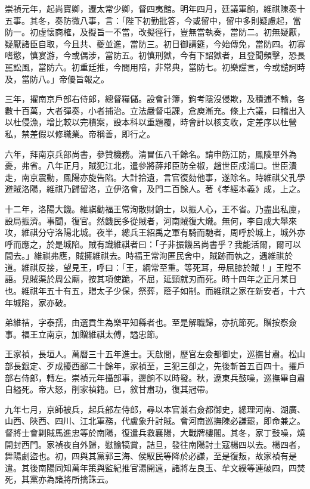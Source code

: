 \begin{pinyinscope}
崇禎元年，起尚寶卿，遷太常少卿，督四夷館。明年四月，廷議軍餉，維祺陳奏十五事。其冬，奏防微八事，言：「陛下初勤批答，今或留中，留中多則疑慮起，當防一。初虛懷商榷，及擬旨一不當，改擬徑行，豈無當執奏，當防二。初無疑厭，疑厭諸臣自取，今且共、夔並進，當防三。初日御講筵，今始傳免，當防四。初寡嗜慾，慎宴游，今或偶涉，當防五。初慎刑獄，今有下詔獄者，且登聞頻擊，恐長嚚訟風，當防六。初重廷推，今間用陪，非常典，當防七。初樂讜言，今或譴訶時及，當防八。」帝優旨報之。

三年，擢南京戶部右侍郎，總督糧儲。設會計簿，鉤考隱沒侵欺，及積逋不輸，各數十百萬，大者彈奏，小者捕治。立法嚴督屯課，倉庾漸充。條上六議，曰稽出入以杜侵漁，增比較以完積案，設本科以重題覆，時會計以核支收，定差序以杜營私，禁差假以修職業。帝稱善，即行之。

六年，拜南京兵部尚書，參贊機務。清冒伍八千餘名。請申飭江防，鳳陵單外為憂，弗省。八年正月，賊犯江北，遣參將薛邦臣防全椒，趙世臣戍浦口。世臣潰走，南京震動，鳳陽亦旋告陷。大計拾遺，言官復劾他事，遂除名。時維祺父孔學避賊洛陽，維祺乃歸留洛，立伊洛會，及門二百餘人。著《孝經本義》成，上之。

十二年，洛陽大饑。維祺勸福王常洵散財餉士，以振人心，王不省。乃盡出私廩，設局振濟。事聞，復官。然饑民多從賊者，河南賊復大熾。無何，李自成大舉來攻，維祺分守洛陽北城。夜半，總兵王紹禹之軍有騎而馳者，周呼於城上，城外亦呼而應之，於是城陷。賊有識維祺者曰：「子非振饑呂尚書乎？我能活爾，爾可以間去。」維祺弗應，賊擁維祺去。時福王常洵匿民舍中，賊跡而執之，遇維祺於道。維祺反接，望見王，呼曰：「王，綱常至重。等死耳，毋屈膝於賊！」王瞠不語。見賊渠於周公廟，按其項使跪，不屈，延頸就刃而死。時十四年之正月某日也。維祺年五十有五，贈太子少保，祭葬，蔭子如制。而維祺之家在新安者，十六年城陷，家亦破。

弟維祮，字泰孺，由選貢生為樂平知縣者也。至是解職歸，亦抗節死。贈按察僉事。福王立南京，加贈維祺太傅，謚忠節。

王家禎，長垣人。萬曆三十五年進士。天啟間，歷官左僉都御史，巡撫甘肅。松山部長銀定、歹成擾西鄙二十餘年，家禎至，三犯三卻之，先後斬首五百四十。擢戶部右侍郎，轉左。崇禎元年攝部事，邊餉不以時發。秋，遼東兵鼓噪，巡撫畢自肅自縊死。帝大怒，削家禎籍。已，敘甘肅功，復其冠帶。

九年七月，京師被兵，起兵部左侍郎，尋以本官兼右僉都御史，總理河南、湖廣、山西、陜西、四川、江北軍務，代盧象升討賊。會河南巡撫陳必謙罷，即命兼之。督將士會剿賊馬進忠等於南陽，復遣兵救襄陽，大戰牌樓閣。其冬，家丁鼓噪，燒開封西門。家禎夜自外歸，慰諭犒賞，詰旦，發往南陽討土寇楊四以去。楊四者，舞陽劇盜也。初，四與其黨郭三海、侯馭民等降於必謙，至是復叛，故家禎有是遣。其後南陽同知萬年策與監紀推官湯開遠，諸將左良玉、牟文綬等連破四，四焚死，其黨亦為諸將所擒誅云。


\end{pinyinscope}
